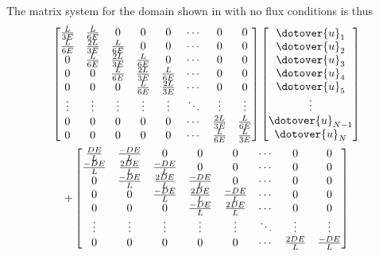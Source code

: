 The matrix system for the domain shown in  with no flux conditions is thus
\begin{multline}
  \begin{bmatrix}
    \frac{L}{3E} & \frac{L}{6E} & 0 & 0 & 0 & \cdots & 0 & 0 \\
    \frac{L}{6E} & \frac{2L}{3E} &  \frac{L}{6E} & 0 & 0 & \cdots & 0 & 0 \\
    0 & \frac{L}{6E} & \frac{2L}{3E} &  \frac{L}{6E} & 0 & \cdots & 0 & 0 \\
    0 & 0 & \frac{L}{6E} & \frac{2L}{3E} &  \frac{L}{6E} & \cdots & 0 & 0 \\
    0 & 0 & 0 & \frac{L}{6E} & \frac{2L}{3E} & \cdots & 0 & 0 \\
    \vdots & \vdots & \vdots & \vdots & \vdots & \ddots & \vdots & \vdots \\
    0 & 0 & 0 & 0 & 0 & \cdots & \frac{2L}{3E} & \frac{L}{6E} \\
    0 & 0 & 0 & 0 & 0 & \cdots & \frac{L}{6E} & \frac{L}{3E} \\
  \end{bmatrix} \begin{bmatrix}
    \dotover{u}_{1} \\
    \dotover{u}_{2} \\
    \dotover{u}_{3} \\
    \dotover{u}_{4} \\
    \dotover{u}_{5} \\
    \vdots \\
    \dotover{u}_{N-1} \\
    \dotover{u}_{N} \\
  \end{bmatrix} \\
  + \begin{bmatrix}
    \frac{DE}{L} & \frac{-DE}{L} & 0 & 0 & 0 & \cdots & 0 & 0 \\
    \frac{-DE}{L} & \frac{2DE}{L} &  \frac{-DE}{L} & 0 & 0 & \cdots & 0 & 0 \\
    0 & \frac{-DE}{L} & \frac{2DE}{L} &  \frac{-DE}{L} & 0 & \cdots & 0 & 0 \\
    0 & 0 & \frac{-DE}{L} & \frac{2DE}{L} &  \frac{-DE}{L} & \cdots & 0 & 0 \\
    0 & 0 & 0 & \frac{-DE}{L} & \frac{2DE}{L} & \cdots & 0 & 0 \\
    \vdots & \vdots & \vdots & \vdots & \vdots & \ddots & \vdots & \vdots \\
    0 & 0 & 0 & 0 & 0 & \cdots & \frac{2DE}{L} & \frac{-DE}{L} \\

\end{bmatrix}
\end{multline}

